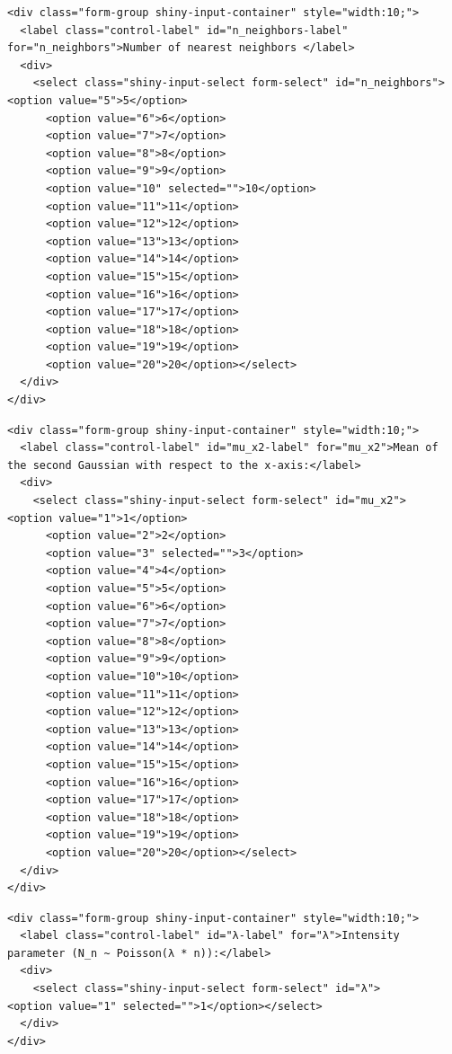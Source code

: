 \documentclass[
  letterpaper,
  DIV=11,
  numbers=noendperiod]{scrartcl}
\begin{document}
\label{input_selects_2-3}
\begin{verbatim}
<div class="form-group shiny-input-container" style="width:10;">
  <label class="control-label" id="n_neighbors-label" for="n_neighbors">Number of nearest neighbors </label>
  <div>
    <select class="shiny-input-select form-select" id="n_neighbors">      <option value="5">5</option>
      <option value="6">6</option>
      <option value="7">7</option>
      <option value="8">8</option>
      <option value="9">9</option>
      <option value="10" selected="">10</option>
      <option value="11">11</option>
      <option value="12">12</option>
      <option value="13">13</option>
      <option value="14">14</option>
      <option value="15">15</option>
      <option value="16">16</option>
      <option value="17">17</option>
      <option value="18">18</option>
      <option value="19">19</option>
      <option value="20">20</option></select>
  </div>
</div>
\end{verbatim}

\label{input_selects_2-4}
\begin{verbatim}
<div class="form-group shiny-input-container" style="width:10;">
  <label class="control-label" id="mu_x2-label" for="mu_x2">Mean of the second Gaussian with respect to the x-axis:</label>
  <div>
    <select class="shiny-input-select form-select" id="mu_x2">      <option value="1">1</option>
      <option value="2">2</option>
      <option value="3" selected="">3</option>
      <option value="4">4</option>
      <option value="5">5</option>
      <option value="6">6</option>
      <option value="7">7</option>
      <option value="8">8</option>
      <option value="9">9</option>
      <option value="10">10</option>
      <option value="11">11</option>
      <option value="12">12</option>
      <option value="13">13</option>
      <option value="14">14</option>
      <option value="15">15</option>
      <option value="16">16</option>
      <option value="17">17</option>
      <option value="18">18</option>
      <option value="19">19</option>
      <option value="20">20</option></select>
  </div>
</div>
\end{verbatim}

\label{input_selects_2-5}
\begin{verbatim}
<div class="form-group shiny-input-container" style="width:10;">
  <label class="control-label" id="λ-label" for="λ">Intensity parameter (N_n ~ Poisson(λ * n)):</label>
  <div>
    <select class="shiny-input-select form-select" id="λ">      <option value="1" selected="">1</option></select>
  </div>
</div>
\end{verbatim}
\end{document}
